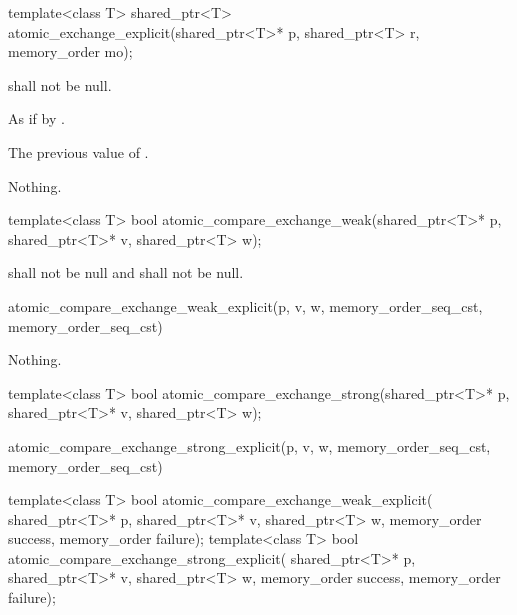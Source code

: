 %
\begin{itemdecl}
template<class T>
  shared_ptr<T> atomic_exchange_explicit(shared_ptr<T>* p, shared_ptr<T> r, memory_order mo);
\end{itemdecl}

\begin{itemdescr}
\pnum
\requires {} shall not be null.

\pnum
\effects As if by .

\pnum
\returns The previous value of .

\pnum
\throws Nothing.
\end{itemdescr}

%
\begin{itemdecl}
template<class T>
  bool atomic_compare_exchange_weak(shared_ptr<T>* p, shared_ptr<T>* v, shared_ptr<T> w);
\end{itemdecl}

\begin{itemdescr}
\pnum
\requires {} shall not be null and  shall not be null.

\pnum
\returns
\begin{codeblock}
atomic_compare_exchange_weak_explicit(p, v, w, memory_order_seq_cst, memory_order_seq_cst)
\end{codeblock}

\pnum
\throws Nothing.
\end{itemdescr}

%
\begin{itemdecl}
template<class T>
  bool atomic_compare_exchange_strong(shared_ptr<T>* p, shared_ptr<T>* v, shared_ptr<T> w);
\end{itemdecl}

\begin{itemdescr}
\pnum
\returns
\begin{codeblock}
atomic_compare_exchange_strong_explicit(p, v, w, memory_order_seq_cst, memory_order_seq_cst)
\end{codeblock}
\end{itemdescr}

%
%
\begin{itemdecl}
template<class T>
  bool atomic_compare_exchange_weak_explicit(
    shared_ptr<T>* p, shared_ptr<T>* v, shared_ptr<T> w,
    memory_order success, memory_order failure);
template<class T>
  bool atomic_compare_exchange_strong_explicit(
    shared_ptr<T>* p, shared_ptr<T>* v, shared_ptr<T> w,
    memory_order success, memory_order failure);
\end{itemdecl}

